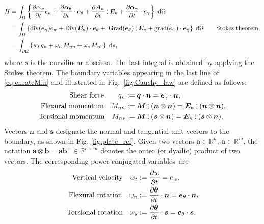 \begin{equation}
\label{eq:enrateMin}
\begin{aligned}
\dot{H}&= \int_{\Omega} \left\{ \diffp{\alpha_w}{t} e_w  + \diffp{\bm\alpha_\theta}{t} \cdot \bm{e}_\theta + \diffp{\bm{A}_{\kappa}}{t} \cddot \bm{E}_{\kappa}  + \diffp{\bm\alpha_{\gamma}}{t} \cdot \bm{e}_{\gamma} \right\} \d\Omega\\
&= \int_{\Omega} \left\{ \div(\bm{e}_{\gamma}) e_w  + \Div(\bm{E}_{\kappa}) \cdot \bm{e}_\theta + \; \Grad(\bm{e}_{\theta}) \cddot \bm{E}_{\kappa}  + \grad (e_w) \cdot \bm{e}_{\gamma} \right\} \d\Omega \qquad \text{Stokes theorem,} \\
&= \int_{\partial \Omega} \left\{ w_t \, q_n  + \omega_n \, M_{nn} + \omega_s \, M_{ns} \right\} \d{s},  \\
\end{aligned}
\end{equation}
where $s$ is the curvilinear abscissa. The last integral is obtained by applying the Stokes theorem. The boundary variables appearing in the last line of \eqref{eq:enrateMin} and illustrated in Fig.~\ref{fig:Cauchy_law} are defined as follows:
\begin{equation}
\label{eq:QnMnnMns}
\begin{aligned}
\text{Shear force}  \qquad q_{n} &:= \bm{q} \cdot \bm{n}=  \bm{e}_{\gamma} \cdot \bm{n},  \\
\text{Flexural momentum} \quad 
M_{nn} &:=  \bm{M} \cddot (\bm{n}\otimes{\bm{n}}) = \bm{E}_{\kappa} \cddot (\bm{n}\otimes{\bm{n}}) 	\\
\text{Torsional momentum} \quad M_{ns} &:= \bm{M} \cddot (\bm{s}\otimes{\bm{n}}) = \bm{E}_{\kappa} \cddot (\bm{s}\otimes{\bm{n}}),	
\end{aligned},
\end{equation}
Vectors $\bm{n}$ and $\bm{s}$ designate the normal and tangential unit vectors to the boundary, as shown in Fig. \ref{fig:plate_ref}. Given two vectors $\bm{a} \in \mathbb{R}^n, \, \bm{a} \in \mathbb{R}^m$, the notation $\bm{a}\otimes{\bm{b}} = \bm{a} \bm{b}^\top \in \mathbb{R}^{n\times m}$ denotes the outer (or dyadic) product of two vectors.  The corresponding power conjugated variables~are
\begin{equation} 
\label{eq:wtwnws}
\begin{aligned}
\text{Vertical velocity}  \quad w_t &:= \diffp{w}{t} = e_w, \\
\text{Flexural rotation} \quad 
\omega_{n} &:= \diffp{\bm{\theta}}{t} \cdot \bm{n} = \bm{e}_\theta \cdot \bm{n} \\
\text{Torsional rotation} \quad 
\omega_{s} &:= \diffp{\bm{\theta}}{t} \cdot \bm{s} = \bm{e}_\theta \cdot \bm{s}.	
\end{aligned},
\end{equation}

